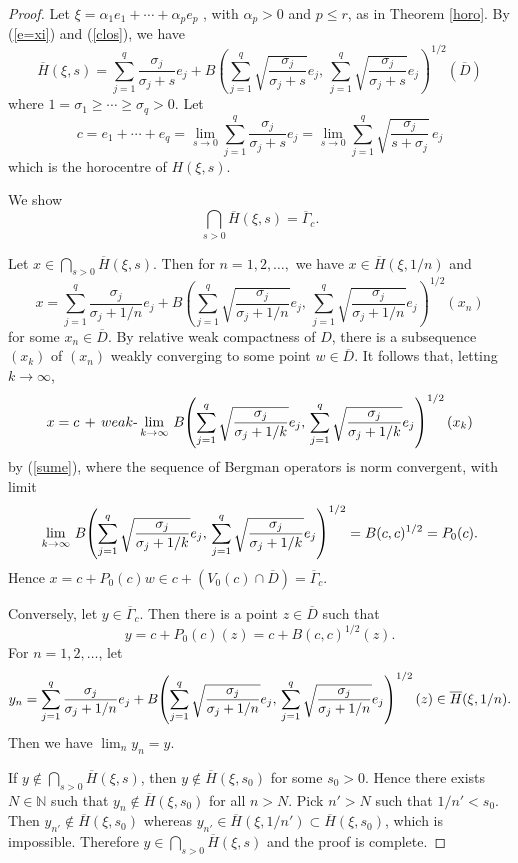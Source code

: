 \documentclass[12pt, twoside]{article}
\theoremstyle{definition}
\numberwithin{equation}{section}
\begin{document}
\begin{proof} Let $\xi= \alpha_1 e_1 + \cdots + \alpha_p e_p$ ,  with $\alpha_p >0$
and $p\leq r$, as in Theorem \ref{horo}. By  (\ref{e=xi}) and (\ref{clos}), we have
$$\overline H(\xi,s)=\sum_{j=1}^q \frac{\sigma_j}{\sigma_j +s} e_j +
B\left (\sum_{j=1}^q \sqrt{\frac{\sigma_j}{\sigma_j+s}} e_j, \,\sum_{j=1}^q \sqrt{\frac{\sigma_j}{\sigma_j+s}} e_j
\right)^{1/2}(\overline D)$$
where $1=\sigma_1 \geq \cdots \geq \sigma_q > 0$.
Let
 \begin{equation}\label{sume}
 c= e_1 + \cdots +e_q = \lim_{s\rightarrow 0}\sum_{j=1}^q \frac{\sigma_j}{\sigma_j+s} e_j
= \lim_{s\rightarrow 0}\sum_{j=1}^q \sqrt{\frac{\sigma_j}{s+\sigma_j}}\, e_j
\end{equation}
which is the horocentre of $H(\xi,s)$.

We show $$\bigcap_{s>0}\overline H (\xi,s) = \overline \Gamma_c.$$

Let $x\in \bigcap_{s>0}\overline H (\xi,s)$. Then for $n=1,2,\ldots,$
we have $x \in \overline H(\xi,1/n)$ and
$$ x= \sum_{j=1}^q \frac{\sigma_j}{\sigma_j + 1/n} e_j +
B\left (\sum_{j=1}^q \sqrt{\frac{\sigma_j}{\sigma_j + 1/n}} e_j, \,\sum_{j=1}^q \sqrt{\frac{\sigma_j}{\sigma_j + 1/n}} e_j
\right)^{1/2}(x_n)$$
for some $x_n \in \overline D$. By relative weak compactness of $D$, there is a subsequence $(x_k)$ of $(x_n)$
weakly converging to some point $w\in \overline D$. It follows that, letting $k\rightarrow \infty$,
$$x = c\, + \, weak\mbox{-}\lim_{k\rightarrow \infty}\,
B\hspace{-.03in}\left(\sum_{j=1}^q \sqrt{\frac{\sigma_j}{\sigma_j + 1/k}} e_j, \,\sum_{j=1}^q \sqrt{\frac{\sigma_j}{\sigma_j + 1/k}} e_j
\right)^{1/2}(x_k)$$
by (\ref{sume}), where the sequence of Bergman operators is norm convergent,  with limit
 $$\lim_{k\rightarrow \infty}\,
B\hspace{-.03in}\left(\sum_{j=1}^q \sqrt{\frac{\sigma_j}{\sigma_j + 1/k}} e_j, \,\sum_{j=1}^q \sqrt{\frac{\sigma_j}{\sigma_j + 1/k}} e_j
\right)^{1/2} =B(c,c)^{1/2}=P_0(c).$$
 Hence $x= c+ P_0(c)w \in c+ (V_0(c)\cap \overline D) = \overline \Gamma_c$.

 Conversely, let $y\in \overline \Gamma_c$. Then there is a point $z\in \overline D$
 such that
$$y= c+ P_0(c)(z) = c+ B(c,c)^{1/2}(z).$$
For $n=1, 2, \ldots$, let
$$y_n =   \sum_{j=1}^q \frac{\sigma_j}{\sigma_j + 1/n} e_j  + B\hspace{-.03in}\left(\sum_{j=1}^q \sqrt{\frac{\sigma_j}{\sigma_j + 1/n}} e_j, \,\sum_{j=1}^q \sqrt{\frac{\sigma_j}{\sigma_j + 1/n}} e_j
\right)^{1/2}(z) \in \overline H (\xi,1/n). $$
Then we have $ \lim_n y_n =y$.

If $y \notin \bigcap_{s>0}\overline H (\xi,s)$, then $y \notin\overline H (\xi,s_0)$ for some $s_0 > 0$.
Hence there exists $N \in \mathbb{N}$ such that $y_n \notin\overline H (\xi,s_0)$ for all $n >N$.
Pick $n'>N$ such that $1/n' < s_0$. Then $y_{n'} \notin\overline H (\xi,s_0)$ whereas
$y_{n'} \in\overline H (\xi, 1/n') \subset \overline H(\xi,s_0)$, which is impossible. Therefore $y \in
\bigcap_{s>0}\overline H (\xi, s)$ and the proof is complete.
\end{proof}
\end{document}
